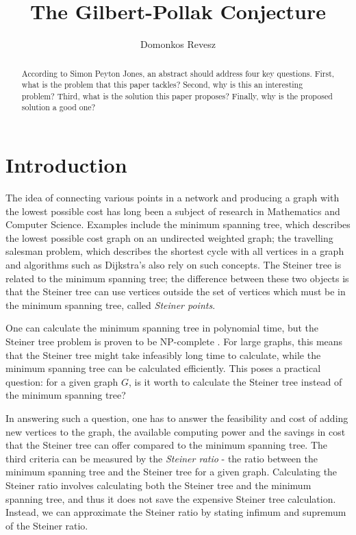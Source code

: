 \documentclass{mpaper}
\begin{document}
\newtheorem{lemma}{Lemma}
\newtheorem{theorem}{Theorem}
\newtheorem{conjecture}{Conjecture}
\theoremstyle{definition}
\newtheorem{definition}{Definition}

\title{The Gilbert-Pollak Conjecture}
\author{Domonkos Revesz}

\maketitle

\begin{abstract}
According to Simon Peyton Jones, an abstract should address
four key questions. First, what is the problem that this
paper tackles? Second, why is this an interesting problem?
Third, what is the solution this paper proposes?
Finally, why is the proposed solution a good one?
\end{abstract}

\section{Introduction}

The idea of connecting various points in a network and producing a graph with the lowest possible cost has long been a subject of research in Mathematics and Computer Science. Examples include the minimum spanning tree, which describes the lowest possible cost graph on an undirected weighted graph; the travelling salesman problem, which describes the shortest cycle with all vertices in a graph and algorithms such as Dijkstra's also rely on such concepts. The Steiner tree is related to the minimum spanning tree; the difference between these two objects is that the Steiner tree can use vertices outside the set of vertices which must be in the minimum spanning tree, called \emph{Steiner points}.

One can calculate the minimum spanning tree in polynomial time, but the Steiner tree problem is proven to be NP-complete \cite{Pettie2008}. For large graphs, this means that the Steiner tree might take infeasibly long time to calculate, while the minimum spanning tree can be calculated efficiently. This poses a practical question: for a given graph $G$, is it worth to calculate the Steiner tree instead of the minimum spanning tree?

 In answering such a question, one has to answer the feasibility and cost of adding new vertices to the graph, the available computing power and the savings in cost that the Steiner tree can offer compared to the minimum spanning tree. The third criteria can be measured by the \emph{Steiner ratio} - the ratio between the minimum spanning tree and the Steiner tree for a given graph. Calculating the Steiner ratio involves calculating both the Steiner tree and the minimum spanning tree, and thus it does not save the expensive Steiner tree calculation. Instead, we can approximate the Steiner ratio by stating infimum and supremum of the Steiner ratio.
 
\end{document}
